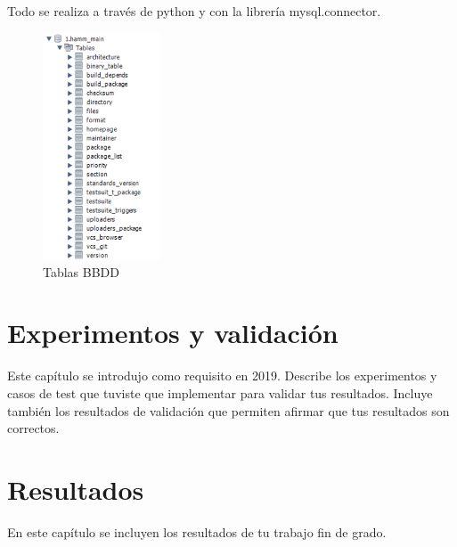 \documentclass[a4paper, 12pt]{book}
\begin{document}
\begin{itemize}
	Todo se realiza a través de python y con la librería mysql.connector.
	
	\begin{figure}[h]
		\centering
		\includegraphics[width=3.5cm, keepaspectratio]{img/Tablas.png}
		\caption{Tablas BBDD}
		\label{fig:Tablas}
	\end{figure}

	
\end{itemize}

\cleardoublepage
\chapter{Experimentos y validación}
\label{chap:experimentos}

Este capítulo se introdujo como requisito en 2019. 
Describe los experimentos y casos de test que tuviste que implementar para validar tus resultados. 
Incluye también los resultados de validación que permiten afirmar que tus resultados son correctos. 



\cleardoublepage
\chapter{Resultados}
\label{chap:resultados}

En este capítulo se incluyen los resultados de tu trabajo fin de grado.
\end{document}
